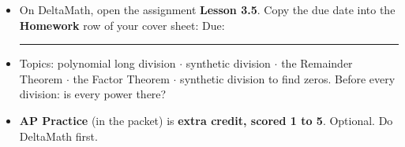 \documentclass[aspectratio=169, 11pt]{beamer}
\begin{document}
\begin{frame}[t, plain]

  \begin{itemize}\setlength{\itemsep}{8pt}
    \item On DeltaMath, open the assignment \textbf{Lesson 3.5}. Copy the due date into the
          \textbf{Homework} row of your cover sheet: \quad Due: \rule{3cm}{0.4pt}
    \item Topics: polynomial long division $\cdot$ synthetic division $\cdot$ the Remainder
          Theorem $\cdot$ the Factor Theorem $\cdot$ synthetic division to find zeros. Before
          every division: is every power there?
    \item \textbf{AP Practice} (in the packet) is \textbf{extra credit, scored 1 to 5}. Optional.
          Do DeltaMath first.
  \end{itemize}
\end{frame}
\end{document}
